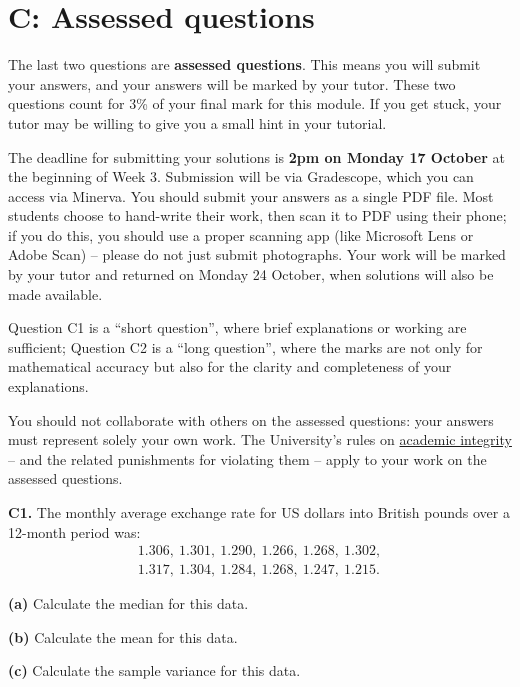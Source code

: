 \documentclass[
  a4paper,
]{book}
\theoremstyle{definition}
\theoremstyle{definition}
\theoremstyle{definition}
\theoremstyle{definition}
\theoremstyle{remark}
\begin{document}
\hypertarget{P1-assessed}{%
\section*{C: Assessed questions}\label{P1-assessed}}

The last two questions are \textbf{assessed questions}. This means you will submit your answers, and your answers will be marked by your tutor. These two questions count for 3\% of your final mark for this module. If you get stuck, your tutor may be willing to give you a small hint in your tutorial.

The deadline for submitting your solutions is \textbf{2pm on Monday 17 October} at the beginning of Week 3. Submission will be via Gradescope, which you can access via Minerva.
You should submit your answers as a single PDF file. Most students choose to hand-write their work, then scan it to PDF using their phone; if you do this, you should use a proper scanning app (like Microsoft Lens or Adobe Scan) -- please do not just submit photographs. Your work will be marked by your tutor and returned on Monday 24 October, when solutions will also be made available.

Question C1 is a ``short question'', where brief explanations or working are sufficient; Question C2 is a ``long question'', where the marks are not only for mathematical accuracy but also for the clarity and completeness of your explanations.

You should not collaborate with others on the assessed questions: your answers must represent solely your own work. The University's rules on \href{https://library.leeds.ac.uk/info/1401/academic_skills/46/academic_integrity_and_plagiarism}{academic integrity} -- and the related punishments for violating them -- apply to your work on the assessed questions.

\textbf{C1.} The monthly average exchange rate for US dollars into British pounds over a 12-month period was:
\begin{gather*}
1.306, \ 1.301, \ 1.290, \ 1.266, \ 1.268, \ 1.302,\\
1.317, \ 1.304, \ 1.284, \ 1.268, \ 1.247, \ 1.215.
\end{gather*}

\textbf{(a)} Calculate the median for this data.

\textbf{(b)} Calculate the mean for this data.

\textbf{(c)} Calculate the sample variance for this data.
\end{document}
